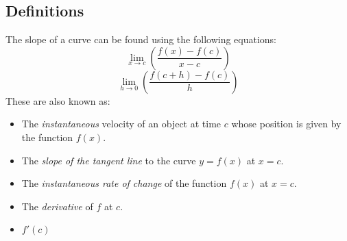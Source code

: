 \subsection{Definitions}
The slope of a curve can be found using the following equations:
\begin{equation}
    \lim_{x \to c} \left(\dfrac{f(x) - f(c)}{x - c}\right)
\end{equation}
\begin{equation}
    \lim_{h \to 0} \left(\dfrac{f(c + h) - f(c)}{h}\right)
\end{equation}
These are also known as:
\begin{itemize}
    \item The \textit{instantaneous} velocity of an object at time $c$ whose position is given by the function $f(x)$.
    \item The \textit{slope of the tangent line} to the curve $y = f(x)$ at $x = c$.
    \item The \textit{instantaneous rate of change} of the function $f(x)$ at $x = c$.
    \item The \textit{derivative} of $f$ at $c$.
    \item $f'(c)$
\end{itemize}
